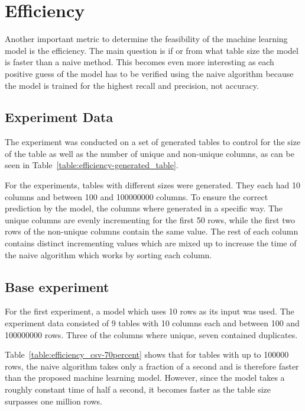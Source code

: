 \section{Efficiency}\label{sec:efficiency}
Another important metric to determine the feasibility of the machine learning model is the efficiency. The main question is if or from what table size the model is faster than a naive method. This becomes even more interesting as each positive guess of the model has to be verified using the naive algorithm because the model is trained for the highest recall and precision, not accuracy. %


\subsection{Experiment Data}\label{subsec:efficiency-experiment_data}
The experiment was conducted on a set of generated tables to control for the size of the table as well as the number of unique and non-unique columns, as can be seen in Table~\ref{table:efficiency-generated_table}.

For the experiments, tables with different sizes were generated. They each had \num{10} columns and between \num{100} and \num{100000000} columns. To ensure the correct prediction by the model, the columns where generated in a specific way. The unique columns are evenly incrementing for the first \num{50} rows, while the first two rows of the non-unique columns contain the same value. The rest of each column contains distinct incrementing values which are mixed up to increase the time of the naive algorithm which works by sorting each column. %




\subsection{Base experiment}\label{subsec:efficiency-base_experiment}
For the first experiment, a model which uses 10 rows as its input was used. The experiment data consisted of \num{9} tables with \num{10} columns each and between \num{100} and \num{100000000} rows. Three of the columns where unique, seven contained duplicates.

Table~\ref{table:efficiency_csv-70percent} shows that for tables with up to \num{100000} rows, the naive algorithm takes only a fraction of a second and is therefore faster than the proposed machine learning model. However, since the model takes a roughly constant time of half a second, it becomes faster as the table size surpasses one million rows.

